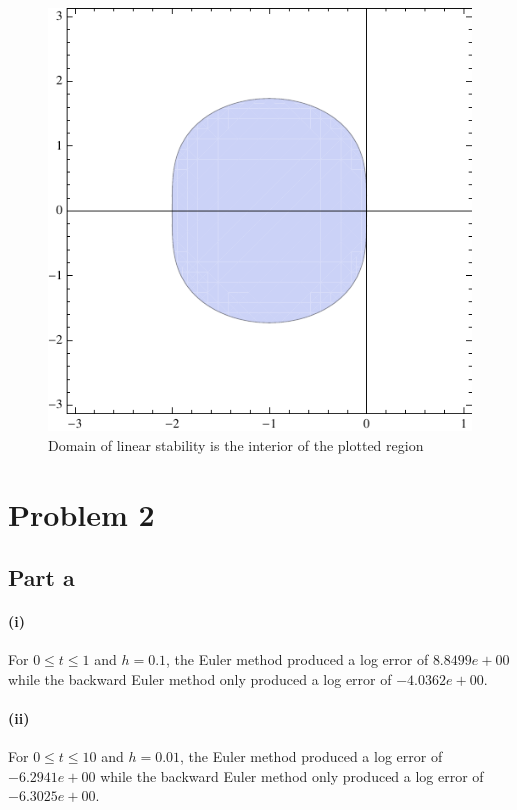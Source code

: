 \documentclass[10pt,letterpaper]{article}
\providecommand{\abs}[1]{\left\lvert#1\right\rvert}
\begin{document}
\begin{figure}[h]
    \begin{center}
        \includegraphics[width=5in,keepaspectratio]{P1.pdf}
    \end{center}
    \caption{Domain of linear stability is the interior of the plotted region}
    \label{fig:P1}
\end{figure}

\section*{Problem 2}
\subsection*{Part a}
\paragraph{(i)}For $0\leq t\leq 1$ and $h=0.1$, the Euler method produced a log error of $8.8499e+00$ 
while the backward Euler method only produced a log error of $-4.0362e+00$.
\paragraph{(ii)}For $0\leq t\leq 10$ and $h=0.01$, the Euler method produced a log error of $-6.2941e+00$ 
while the backward Euler method only produced a log error of $-6.3025e+00$.
\end{document}
